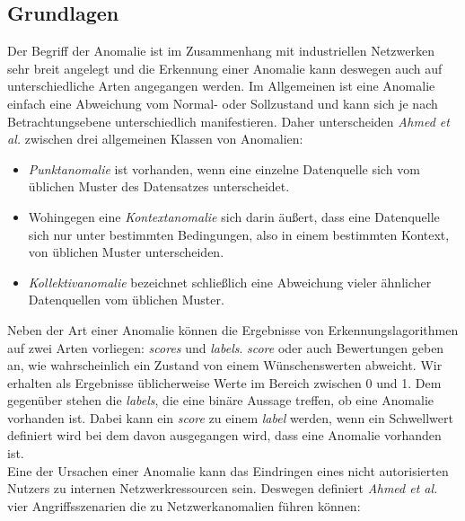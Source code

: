 \subsection{Grundlagen}
Der Begriff der Anomalie ist im Zusammenhang mit industriellen Netzwerken sehr breit angelegt und die Erkennung einer Anomalie kann deswegen auch auf unterschiedliche Arten angegangen werden. Im Allgemeinen ist eine Anomalie einfach eine Abweichung vom Normal- oder Sollzustand und kann sich je nach Betrachtungsebene unterschiedlich manifestieren. Daher unterscheiden \textit{Ahmed et al.}\cite{ahmed2016survey} zwischen drei allgemeinen Klassen von Anomalien:
\begin{itemize}
\item \textit{Punktanomalie} ist vorhanden, wenn eine einzelne Datenquelle sich vom üblichen Muster des Datensatzes unterscheidet.
\item Wohingegen eine \textit{Kontextanomalie} sich darin äußert, dass eine Datenquelle sich nur unter bestimmten Bedingungen, also in einem bestimmten Kontext, von üblichen Muster unterscheiden.
\item \textit{Kollektivanomalie} bezeichnet schließlich eine Abweichung vieler ähnlicher Datenquellen vom üblichen Muster.
\end{itemize}
Neben der Art einer Anomalie können die Ergebnisse von Erkennungslagorithmen auf zwei Arten vorliegen: \textit{\Glspl{score}} und \textit{\Glspl{label}}. \textit{\Gls{score}} oder auch Bewertungen geben an, wie wahrscheinlich ein Zustand von einem Wünschenswerten abweicht. Wir erhalten als Ergebnisse üblicherweise Werte im Bereich zwischen 0 und 1. Dem gegenüber stehen die \textit{\Glspl{label}}, die eine binäre Aussage treffen, ob eine Anomalie vorhanden ist. Dabei kann ein \textit{\Gls{score}} zu einem \textit{\Gls{label}} werden, wenn ein Schwellwert definiert wird bei dem davon ausgegangen wird, dass eine Anomalie vorhanden ist. \cite[p. ~22]{ahmed2016survey}\\
Eine der Ursachen einer Anomalie kann das Eindringen eines nicht autorisierten Nutzers zu internen Netzwerkressourcen sein. Deswegen definiert \textit{Ahmed et al.} \cite{ahmed2016survey} vier Angriffsszenarien die zu Netzwerkanomalien führen können:
